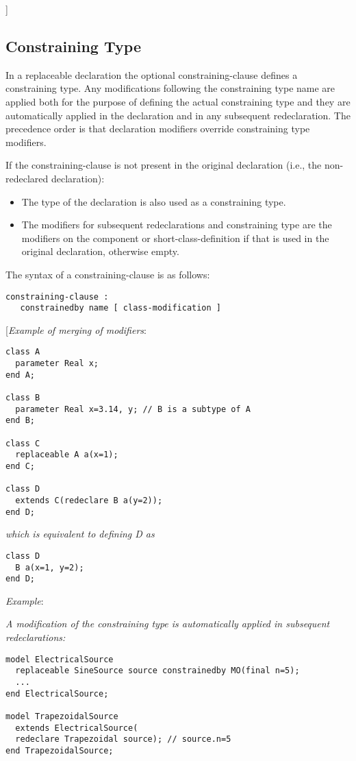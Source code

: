 {]}

\subsection{Constraining Type}

In a replaceable declaration the optional constraining-clause defines a
constraining type. Any modifications following the constraining type
name are applied both for the purpose of defining the actual
constraining type and they are automatically applied in the declaration
and in any subsequent redeclaration. The precedence order is that
declaration modifiers override constraining type modifiers.

If the constraining-clause is not present in the original declaration
(i.e., the non-redeclared declaration):

\begin{itemize}
\item
  The type of the declaration is also used as a constraining type.
\item
  The modifiers for subsequent redeclarations and constraining type are
  the modifiers on the component or short-class-definition if that is
  used in the original declaration, otherwise empty.
\end{itemize}

The syntax of a constraining-clause is as follows:
\begin{lstlisting}[language=grammar]
constraining-clause :
   constrainedby name [ class-modification ]
\end{lstlisting}
{[}\emph{Example of merging of modifiers}:
\begin{lstlisting}[language=modelica]
class A
  parameter Real x;
end A;

class B
  parameter Real x=3.14, y; // B is a subtype of A
end B;

class C
  replaceable A a(x=1);
end C;

class D
  extends C(redeclare B a(y=2));
end D;
\end{lstlisting}

\emph{which is equivalent to defining D as }
\begin{lstlisting}[language=modelica]
class D
  B a(x=1, y=2);
end D;
\end{lstlisting}
\emph{Example}:

\emph{A modification of the constraining type is automatically applied
in subsequent redeclarations:}
\begin{lstlisting}[language=modelica]
model ElectricalSource
  replaceable SineSource source constrainedby MO(final n=5);
  ...
end ElectricalSource;

model TrapezoidalSource
  extends ElectricalSource(
  redeclare Trapezoidal source); // source.n=5
end TrapezoidalSource;
\end{lstlisting}

